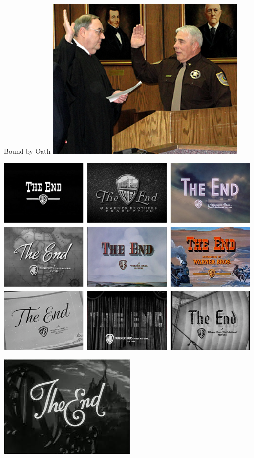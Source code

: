 \begin{frame}{Bound by Oath}
    \centering
    \includegraphics[width=0.75\textwidth]{img/sheriff-oath.png} \\
\end{frame}
%
%

\begin{frame}
   \centering
   \includegraphics[height=.99\textheight]{img/the-end.png} \\
\end{frame}

\begin{frame}
   \centering
   \includegraphics[height=.99\textheight]{img/end1.png} \\
\end{frame}

